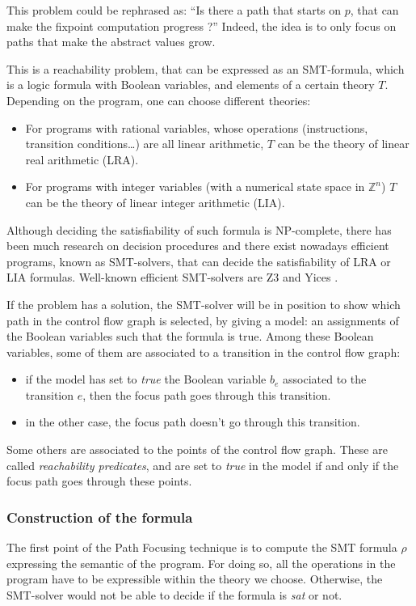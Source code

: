 \documentclass[a4paper,english,titlepage,11pt]{article}
\def\Z{\mathbb{Z}}
\begin{document}
	This problem could be rephrased as:
	``Is there a path that starts on $p$, that can make the fixpoint computation
	progress ?''
	Indeed, the idea is to only focus on paths that make the abstract values
	grow.

	This is a reachability problem, that can be expressed as an SMT-formula,
	which is a logic formula with Boolean variables, and elements of a certain
	theory $T$. Depending on the program, one can choose different theories:
	\begin{itemize}
	\item For programs with rational variables, whose operations (instructions,
	transition conditions\dots) are all linear arithmetic, $T$ can be the theory
	of linear real arithmetic (LRA).
	\item For programs with integer variables (with a numerical state space in
	$\Z^n$) $T$ can be the theory of linear integer arithmetic (LIA).
	\end{itemize}

	Although deciding the satisfiability of such formula is NP-complete, there
	has been much research on decision procedures \cite{Kroening08} and there exist nowadays
	efficient programs, known as SMT-solvers, that can decide the satisfiability
	of LRA or LIA formulas. Well-known efficient SMT-solvers are
	Z3 \cite{MouraB08} and Yices \cite{DutertreM06}. 

	If the problem has a solution,  the SMT-solver will be in position to show
	which path in the control flow graph is selected, by giving a model: an
	assignments of the Boolean variables such that the formula is true.
	Among these Boolean variables, some of them are associated to a transition
	in the control flow graph:
	\begin{itemize}
	\item if the model has set to \emph{true} the Boolean variable $b_e$ associated
	to the transition $e$, then the focus path goes through this transition.
	\item in the other case, the focus path doesn't go through this transition.
	\end{itemize}
	
	Some others are associated to the points of the control flow graph. These
	are called \emph{reachability predicates}, and are set to \emph{true} in the
	model if and only if the focus path goes through these points.

	\subsubsection{Construction of the formula}
	The first point of the Path Focusing technique is to compute the SMT formula
	$\rho$ expressing the semantic of the program. For doing so, all the
	operations in the program have to be expressible within the theory we
	choose. Otherwise, the SMT-solver would not be able to decide if the formula
	is \emph{sat} or not.
\end{document}
